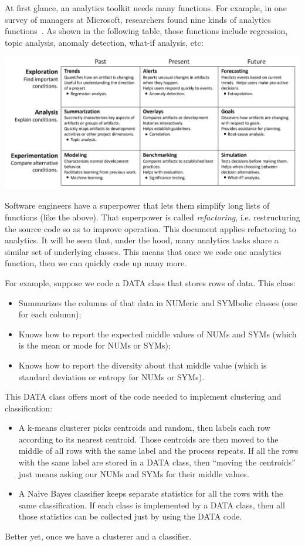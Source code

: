 \documentclass[landscape,	DIV=calc,%
							paper=letter,%
							fontsize=10pt,%
							twocolumn]{scrartcl}	 					%
\begin{document}
At first glance, an analytics toolkit needs many functions.   For example,
in one survey of managers at   Microsoft, 
researchers found nine kinds  of analytics functions~\cite{buse2012information}.
As shown in the following table, those  functions include regression, topic analysis, anomaly detection, what-if analysis,
etc:


\includegraphics[width=\linewidth]{Buse.png} 

Software engineers have a superpower that lets them simplify long lists of functions
(like the above). That superpower is called {\em refactoring}, i.e. 
restructuring the source code  so as to improve operation.
This document applies  refactoring to analytics. It will be seen that, under
the hood, many
analytics tasks share a similar set of underlying classes.  This means that
once we code one analytics
function, then we can quickly 
code up many more. 

For example, suppose we code a  DATA class that stores rows of data.
This class:
\begin{itemize}
    \item
Summarizes the columns of that data  in   NUMeric and  SYMbolic
classes
(one for each column);
\item Knows how to report the expected middle values of NUMs and SYMs
    (which is the mean or mode  for NUMs or SYMs);
\item Knows how to report the
diversity about that middle value (which is standard deviation or entropy for
NUMs or SYMs).
\end{itemize}
This DATA class offers most of the code needed to implement  clustering  and  classification:
\begin{itemize}
    \item
        A k-means clusterer picks centroids and random, then labels each row according to 
        its nearest centroid. Those centroids are then moved to the middle of all rows with the same label and
        the process repeats. If all the rows with the same label are stored in  a DATA class, then ``moving the centroids''
        just means asking our NUMs and SYMs for their middle values.
\item A Naive Bayes classifier keeps separate statistics for all the rows with the same classification.
    If each class is implemented by a DATA class, then all those statistics can be collected just by using the DATA code.
\end{itemize} 
Better yet, 
once we have a clusterer and a classifier.
\end{document}
